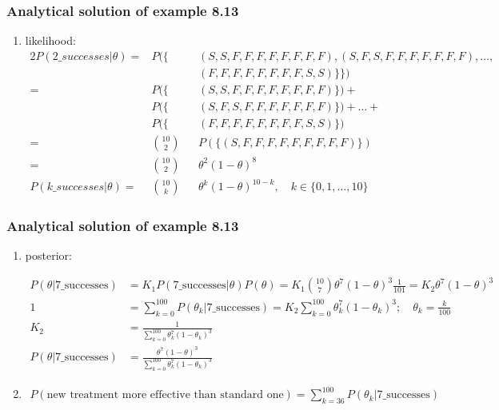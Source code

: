 \begin{frame}
    \frametitle{Analytical solution of example 8.13}

    \tiny
	\begin{enumerate}[a]
        \conti
		\item likelihood:
			\begin{alignat*}{2}
				P(2\_successes|\theta)=&P(\{&&(S,S,F,F,F,F,F,F,F,F),(S,F,S,F,F,F,F,F,F,F),\ldots,\\
                                      &    &&(F,F,F,F,F,F,F,F,S,S)\}\})\\
                                     =&P(\{&&(S,S,F,F,F,F,F,F,F,F)\})+\\
                                      &P(\{&&(S,F,S,F,F,F,F,F,F,F)\})+\ldots+\\
                                      &P(\{&&(F,F,F,F,F,F,F,F,S,S)\})\\
                                     =&\binom{10}{2}&&P(\{(S,F,F,F,F,F,F,F,F,F)\})\\
                                     =&\binom{10}{2}&&\theta^2(1-\theta)^8\\
			    P(k\_successes|\theta)=&\binom{10}{k}&&\theta^k(1-\theta)^{10-k},\quad k\in\{0,1,\ldots,10\}
			\end{alignat*}
            \seti

	\end{enumerate}
\end{frame}

\begin{frame}
    \frametitle{Analytical solution of example 8.13}

    \tiny
	\begin{enumerate}[a]
        \conti
		\item posterior:

			\begin{align*}
				P(\theta|\text{7\_successes})&=K_1P(\text{7\_successes}|\theta)P(\theta)=K_1\binom{10}{7}\theta^7(1-\theta)^3\frac{1}{101}=K_2\theta^7(1-\theta)^3\\
                1&=\sum_{k=0}^{100}P(\theta_k|\text{7\_successes})=K_2\sum_{k=0}^{100}\theta_k^7(1-\theta_k)^3;\quad\theta_k=\frac{k}{100}\\
                K_2&=\frac{1}{\sum_{k=0}^{100}\theta_k^7(1-\theta_k)^3}\\
                P(\theta|\text{7\_successes})&=\frac{\theta^7(1-\theta)^3}{\sum_{k=0}^{100}\theta_k^7(1-\theta_k)^3}
			\end{align*}

		\item 

            \begin{align*}
                P(\text{new treatment more effective than standard one})=\sum_{k=36}^{100}P(\theta_k|\text{7\_successes})
            \end{align*}

	\end{enumerate}
\end{frame}


